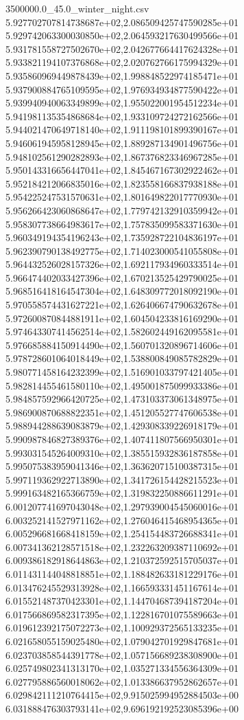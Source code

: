 \begin{filecontents*}{3500000.0_45.0_winter_night.csv}
5.927702707814738687e+02,2.086509425747590285e+01
5.929742063300030850e+02,2.064593217630499566e+01
5.931781558727502670e+02,2.042677664417624328e+01
5.933821194107376868e+02,2.020762766175994329e+01
5.935860969449878439e+02,1.998848522974185471e+01
5.937900884765109595e+02,1.976934934877590422e+01
5.939940940063349899e+02,1.955022001954512234e+01
5.941981135354868684e+02,1.933109724272162566e+01
5.944021470649718140e+02,1.911198101899390167e+01
5.946061945958128945e+02,1.889287134901496756e+01
5.948102561290282893e+02,1.867376823346967285e+01
5.950143316656447041e+02,1.845467167302922462e+01
5.952184212066835016e+02,1.823558166837938188e+01
5.954225247531570631e+02,1.801649822017770930e+01
5.956266423060868647e+02,1.779742132910359942e+01
5.958307738664983617e+02,1.757835099583371630e+01
5.960349194354196243e+02,1.735928722104836197e+01
5.962390790138492775e+02,1.714023000541055808e+01
5.964432526028157326e+02,1.692117934960333514e+01
5.966474402033427396e+02,1.670213525429790025e+01
5.968516418164547304e+02,1.648309772018092190e+01
5.970558574431627221e+02,1.626406674790632678e+01
5.972600870844881911e+02,1.604504233816169290e+01
5.974643307414562514e+02,1.582602449162095581e+01
5.976685884150914490e+02,1.560701320896714606e+01
5.978728601064018449e+02,1.538800849085782829e+01
5.980771458164232399e+02,1.516901033797421405e+01
5.982814455461580110e+02,1.495001875099933386e+01
5.984857592966420725e+02,1.473103373061348975e+01
5.986900870688822351e+02,1.451205527747606538e+01
5.988944288639083879e+02,1.429308339226918179e+01
5.990987846827389376e+02,1.407411807566950301e+01
5.993031545264009310e+02,1.385515932836187858e+01
5.995075383959041346e+02,1.363620715100387315e+01
5.997119362922713890e+02,1.341726154428215523e+01
5.999163482165366759e+02,1.319832250886611291e+01
6.001207741697043048e+02,1.297939004545060016e+01
6.003252141527971162e+02,1.276046415468954365e+01
6.005296681668418159e+02,1.254154483726688341e+01
6.007341362128571518e+02,1.232263209387110692e+01
6.009386182918644863e+02,1.210372592515705037e+01
6.011431144048818851e+02,1.188482633181229176e+01
6.013476245529313928e+02,1.166593331451167614e+01
6.015521487370423301e+02,1.144704687394187204e+01
6.017566869582317395e+02,1.122816701075589663e+01
6.019612392175072273e+02,1.100929372565133235e+01
6.021658055159025480e+02,1.079042701929847681e+01
6.023703858544391778e+02,1.057156689238308900e+01
6.025749802341313170e+02,1.035271334556364309e+01
6.027795886560018062e+02,1.013386637952862657e+01
6.029842111210764415e+02,9.915025994952884503e+00
6.031888476303793141e+02,9.696192192523085396e+00

\end{filecontents*}
